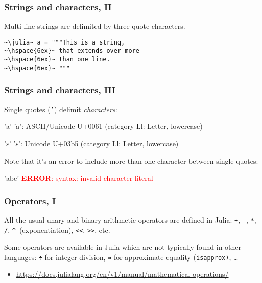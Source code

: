 \documentclass[english,serif,mathserif,xcolor=pdftex,dvipsnames,table]{beamer}
\begin{document}
\begin{frame}[fragile]
  \frametitle{Strings and characters, II}
  Multi-line strings are delimited by three quote characters.
\begin{lstlisting}[showstringspaces=false]
~\julia~ a = """This is a string,
~\hspace{6ex}~ that extends over more
~\hspace{6ex}~ than one line.
~\hspace{6ex}~ """
\end{lstlisting}
\end{frame}


\begin{frame}
  \frametitle{Strings and characters, III}
  Single quotes (\texttt{'}) delimit \emph{characters}:
\begin{semiverbatim}\smaller
\julia 'a'
'a': ASCII/Unicode U+0061 (category Ll: Letter, lowercase)

\julia 'ε'
'ε': Unicode U+03b5 (category Ll: Letter, lowercase)
\end{semiverbatim}

  \+ Note that it's an error to include more than one character
  between single quotes:
\begin{semiverbatim}
\julia 'abc'
\textcolor{red}{\textbf{ERROR}: syntax: invalid character literal}
\end{semiverbatim}
\end{frame}


\begin{frame}[fragile]
  \frametitle{Operators, I}
  All the usual unary and binary arithmetic operators are
  defined in Julia: \texttt{+}, \texttt{-}, \texttt{*}, \texttt{/},
  \texttt{\textasciicircum}~(exponentiation), \texttt{<{}<}, \texttt{>{}>}, etc.

  \+ Some operators are available in Julia which are not typically
  found in other languages: \texttt{÷} for integer division,
  \texttt{≈} for approximate equality (\texttt{isapprox)}, \ldots

  \+
  \begin{references}
    \tiny
    \begin{itemize}
    \item \url{https://docs.julialang.org/en/v1/manual/mathematical-operations/}
    \end{itemize}
  \end{references}
\end{frame}
\end{document}
